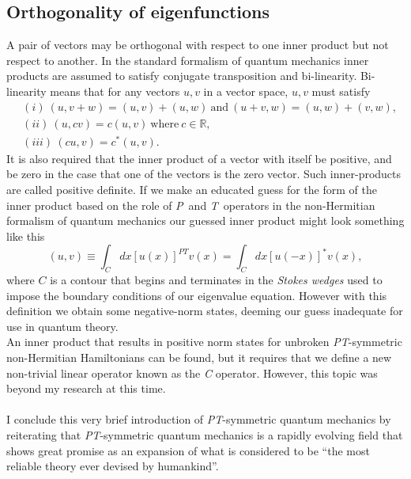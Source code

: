\documentclass[10pt, a4paper, singlespacing]{report}
\newcommand\PT{\emph{PT}}
\newcommand\PP{\emph{P}}
\newcommand\TT{\emph{T}}
\begin{document}
\subsection{Orthogonality of eigenfunctions}\label{Orthogonal}
A pair of vectors may be orthogonal with respect to one inner product but not respect to another. In the standard formalism of quantum mechanics inner products are assumed to satisfy conjugate transposition and bi-linearity. Bi-linearity means that for any vectors $u, v$ in a vector space, $u, v$ must satisfy\cite{Jones-Smith} 
\begin{equation}
\begin{split}
&(i)\ (u, v + w) = (u, v) + (u, w) \mathrm{\ and\ } (u + v, w) = (u, w) + (v, w),\\
&(ii)\ (u, cv) = c(u, v) \mathrm{\ where\ } c \in \mathds{R},\\
&(iii)\ (cu, v) = c^*(u, v).
\end{split}
\end{equation}
It is also required that the inner product of a vector with itself be positive,
and be zero in the case that one of the vectors is the zero vector. Such inner-products are called positive definite\cite{Jones-Smith}.
If we make an educated guess for the form of the inner product based on the role of \PP\ and \TT\ operators in the non-Hermitian formalism of quantum mechanics our guessed inner product might look something like this
\begin{equation}
(u, v) \equiv \int_C dx [u(x)]^{PT} v(x) = \int_C dx [u(-x)]^*v(x),
\end{equation}
where $C$ is a contour that begins and terminates in the \emph{Stokes wedges} used to impose the boundary conditions of our eigenvalue equation. However with this definition we obtain some negative-norm states, deeming our guess inadequate for use in quantum theory\cite{BenderPT}\cite{Jones-Smith}\cite{Moiseyev}.\\
An inner product that results in positive norm states for unbroken \PT-symmetric non-Hermitian Hamiltonians can be found, but it requires that we define a new non-trivial linear operator known as the \emph{C} operator. However, this topic was beyond my research at this time.\\\\
I conclude this very brief introduction of \PT-symmetric quantum mechanics by reiterating that \PT-symmetric quantum mechanics is a rapidly evolving field that shows great promise as an expansion of what is considered to be ``the most reliable theory ever devised by humankind''.
\end{document}
